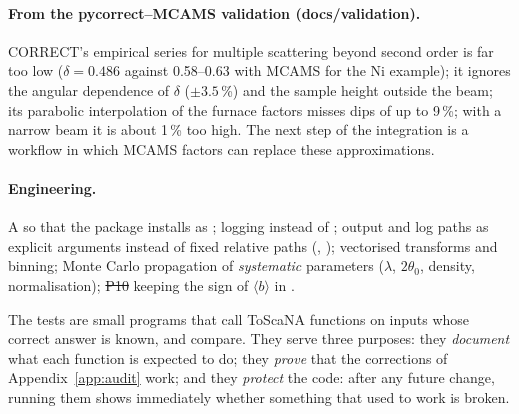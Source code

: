 \documentclass[11pt,a4paper]{article}
\begin{document}
\paragraph{From the pycorrect--MCAMS validation (docs/validation).} CORRECT's
empirical series for multiple scattering beyond second order is far too low
($\delta = 0.486$ against 0.58--0.63 with MCAMS for the Ni example); it
ignores the angular dependence of $\delta$ ($\pm3.5$\,\%) and the sample
height outside the beam; its parabolic interpolation of the furnace factors
misses dips of up to 9\,\%; with a narrow beam it is about 1\,\% too high.
The next step of the integration is a workflow in which MCAMS factors can
replace these approximations.

\paragraph{Engineering.} A  so that the package
installs as ; logging instead of ; output and log
paths as explicit arguments instead of fixed relative paths
(, ); vectorised transforms and binning;
Monte Carlo propagation of \emph{systematic} parameters ($\lambda$,
$2\theta_0$, density, normalisation); \st{P10} keeping the sign of
$\langle b\rangle$ in .
\label{app:tests}


The tests are small programs that call ToScaNA functions on inputs whose
correct answer is known, and compare. They serve three purposes: they
\emph{document} what each function is expected to do; they \emph{prove}
that the corrections of Appendix~\ref{app:audit} work; and they
\emph{protect} the code: after any future change, running them shows
immediately whether something that used to work is broken.
\end{document}
